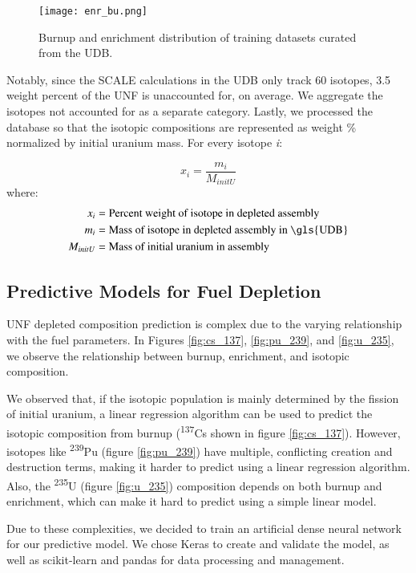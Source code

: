 \begin{figure}
    \centering
    \texttt{[image: enr\_bu.png]}
    \caption{Burnup and enrichment distribution of training
             datasets curated from the \gls{UDB}.}
    \label{fig:enr_bu}
\end{figure}


Notably, since the SCALE calculations in the \gls{UDB} only track 60 isotopes,
3.5 weight percent of the \gls{UNF} is unaccounted for, on average. We
aggregate the isotopes not accounted for as a separate category. Lastly,
we processed the database so that the isotopic compositions are 
represented as weight \% normalized by initial uranium mass.
For every isotope \textit{i}:

\begin{equation}
x_i = \frac{m_i}{M_{initU}}
\end{equation}
where:
\begin{align*}
x_i &= \text{Percent weight of isotope in depleted assembly}\\
m_i &= \text{Mass of isotope in depleted assembly in \gls{UDB}}\\
M_{initU} &= \text{Mass of initial uranium in assembly}
\end{align*}


\subsection{Predictive Models for Fuel Depletion}

\gls{UNF} depleted composition prediction is complex
due to the varying relationship with the fuel parameters.
In Figures \ref{fig:cs_137}, \ref{fig:pu_239}, and \ref{fig:u_235},
we observe the relationship between
burnup, enrichment, and isotopic composition.

We observed that, if the isotopic population is mainly determined by
the fission of initial uranium, a linear regression algorithm
can be used to predict the isotopic composition from burnup
(\textsuperscript{137}Cs shown in figure \ref{fig:cs_137}).
However, isotopes like \textsuperscript{239}Pu (figure \ref{fig:pu_239}) have multiple, conflicting creation
and destruction terms, making it harder to predict using a
linear regression algorithm. Also, the \textsuperscript{235}U (figure \ref{fig:u_235})
composition
depends on both burnup and enrichment, which can make it
hard to predict using a simple linear model.

Due to these complexities, we decided to train an artificial
dense neural network for our predictive model. We chose
Keras \cite{collet_keras_2015} to create and validate the model,
as well as scikit-learn \cite{pedregosa_scikit-learn_2011}
and pandas \cite{mckinney-proc-scipy-2010} for data processing and management.

